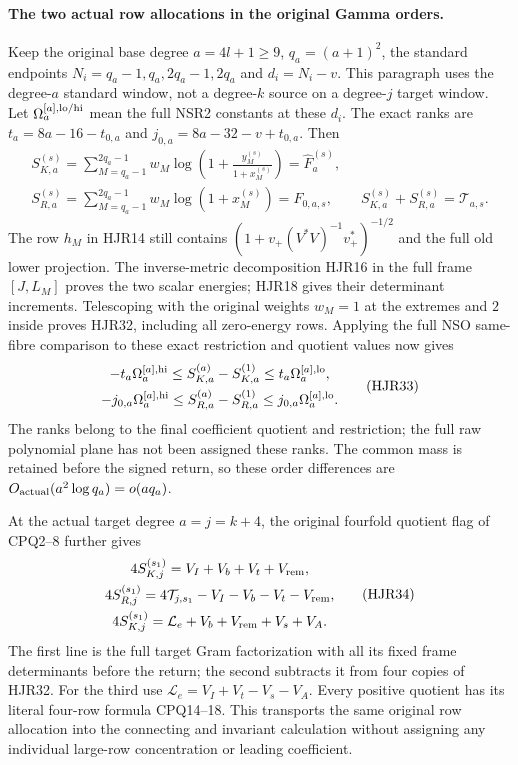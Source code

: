 \documentclass[11pt,a4paper]{article}
\begin{document}
\paragraph{The two actual row allocations in the original Gamma orders.}
Keep the original base degree $a=4l+1\ge9$, $q_a=(a+1)^2$,
the standard endpoints $N_i=q_a-1,q_a,2q_a-1,2q_a$ and
$d_i=N_i-v$. This paragraph uses the degree-$a$ standard
window, not a degree-$k$ source on a degree-$j$ target window.
Let $\Omega_a^{[a],\rm lo/hi}$ mean the full NSR2 constants
at these $d_i$. The exact ranks are
$t_a=8a-16-t_{0,a}$ and $j_{0,a}=8a-32-v+t_{0,a}$.
Then
\[
 \begin{gathered}
 S_{K,a}^{(s)}
  =\sum_{M=q_a-1}^{2q_a-1}w_M
                \log\left(1+\frac{y_M^{(s)}}{1+x_M^{(s)}}\right)
  =\widehat F_a^{(s)},\\
 S_{R,a}^{(s)}
  =\sum_{M=q_a-1}^{2q_a-1}w_M\log(1+x_M^{(s)})
  =F_{0,a,s},\qquad
 S_{K,a}^{(s)}+S_{R,a}^{(s)}=\mathcal T_{a,s}.
 \end{gathered}\tag{HJR32}
\]
The row $h_M$ in HJR14 still contains
$(1+v_+(V^*V)^{-1}v_+^*)^{-1/2}$ and the full old
lower projection. The inverse-metric decomposition HJR16
in the full frame $[J,L_M]$ proves the two scalar energies;
HJR18 gives their determinant increments. Telescoping with
the original weights $w_M=1$ at the extremes and $2$ inside
proves HJR32, including all zero-energy rows.
Applying the full NSO same-fibre comparison to these exact
restriction and quotient values now gives
\[
 \begin{gathered}
 -t_a\Omega_a^{[a],\rm hi}
 \le S_{K,a}^{(a)}-S_{K,a}^{(1)}
 \le t_a\Omega_a^{[a],\rm lo},\\
 -j_{0,a}\Omega_a^{[a],\rm hi}
 \le S_{R,a}^{(a)}-S_{R,a}^{(1)}
 \le j_{0,a}\Omega_a^{[a],\rm lo}.
 \end{gathered}\tag{HJR33}
\]
The ranks belong to the final coefficient quotient and
restriction; the full raw polynomial plane has not been
assigned these ranks. The common mass is retained before
the signed return, so these order differences are
$O_{\rm actual}(a^2\log q_a)=o(aq_a)$.

At the actual target degree $a=j=k+4$, the original
fourfold quotient flag of CPQ2--8 further gives
\[
 \begin{gathered}
 4S_{K,j}^{(s_1)}=V_I+V_b+V_t+V_{\rm rem},\\
 4S_{R,j}^{(s_1)}
       =4\mathcal T_{j,s_1}-V_I-V_b-V_t-V_{\rm rem},\\
 4S_{K,j}^{(s_1)}
       =\mathcal L_e+V_b+V_{\rm rem}+V_s+V_A .
 \end{gathered}\tag{HJR34}
\]
The first line is the full target Gram factorization with
all its fixed frame determinants before the return;
the second subtracts it from four copies of HJR32.
For the third use
$\mathcal L_e=V_I+V_t-V_s-V_A$. Every positive quotient
has its literal four-row formula CPQ14--18. This transports
the same original row allocation into the connecting and
invariant calculation without assigning any individual
large-row concentration or leading coefficient.
\end{document}
